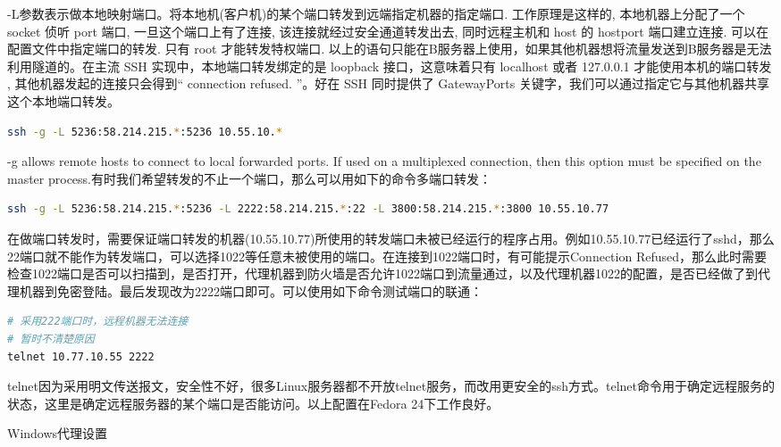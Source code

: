 \documentclass[12pt]{book}
\makeatletter
\numberwithin{dummy}{section}
\theoremstyle{ocrenumbox}
\theoremstyle{blacknumex}
\theoremstyle{blacknumbox}
\theoremstyle{ocrenum}
\renewcommand\paragraph{\@startsection{paragraph}{4}{\z@}
	{-2ex \@plus-.2ex \@minus .2ex}
	{.1ex}
	{\normalfont\small\sffamily\bfseries}}
\makeatother
\begin{document}
-L参数表示做本地映射端口。将本地机(客户机)的某个端口转发到远端指定机器的指定端口. 工作原理是这样的, 本地机器上分配了一个 socket 侦听 port 端口, 一旦这个端口上有了连接, 该连接就经过安全通道转发出去, 同时远程主机和 host 的 hostport 端口建立连接. 可以在配置文件中指定端口的转发. 只有 root 才能转发特权端口. 以上的语句只能在B服务器上使用，如果其他机器想将流量发送到B服务器是无法利用隧道的。在主流 SSH 实现中，本地端口转发绑定的是 loopback 接口，这意味着只有 localhost 或者 127.0.0.1 才能使用本机的端口转发 , 其他机器发起的连接只会得到“ connection refused. ”。好在 SSH 同时提供了 GatewayPorts 关键字，我们可以通过指定它与其他机器共享这个本地端口转发。

\begin{lstlisting}[language=Bash]
ssh -g -L 5236:58.214.215.*:5236 10.55.10.*
\end{lstlisting}

-g allows remote hosts to connect to local forwarded ports.  If used on a multiplexed connection, then this option must be specified on the master process.有时我们希望转发的不止一个端口，那么可以用如下的命令多端口转发：

\begin{lstlisting}[language=Bash]
ssh -g -L 5236:58.214.215.*:5236 -L 2222:58.214.215.*:22 -L 3800:58.214.215.*:3800 10.55.10.77
\end{lstlisting}

在做端口转发时，需要保证端口转发的机器(10.55.10.77)所使用的转发端口未被已经运行的程序占用。例如10.55.10.77已经运行了sshd，那么22端口就不能作为转发端口，可以选择1022等任意未被使用的端口。在连接到1022端口时，有可能提示Connection Refused，那么此时需要检查1022端口是否可以扫描到，是否打开，代理机器到防火墙是否允许1022端口到流量通过，以及代理机器1022的配置，是否已经做了到代理机器到免密登陆。最后发现改为2222端口即可。可以使用如下命令测试端口的联通：

\begin{lstlisting}[language=Bash]
# 采用222端口时，远程机器无法连接
# 暂时不清楚原因
telnet 10.77.10.55 2222
\end{lstlisting}

telnet因为采用明文传送报文，安全性不好，很多Linux服务器都不开放telnet服务，而改用更安全的ssh方式。telnet命令用于确定远程服务的状态，这里是确定远程服务器的某个端口是否能访问。以上配置在Fedora 24下工作良好。

\paragraph{Windows代理设置}
\end{document}
